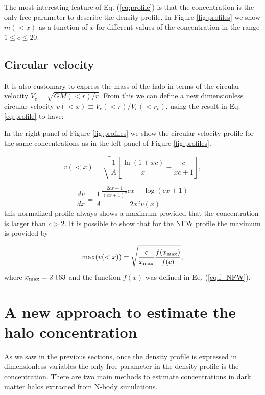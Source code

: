 \documentclass[useAMS,usenatbib]{mn2e}
\begin{document}
The most interesting feature of Eq. (\ref{eq:profile}) is that the
concentration is the only free parameter to describe the density
profile. In Figure \ref{fig:profiles} we show $m(<x)$ as
a function of $x$ for different values of the concentration in the range
$1\leq c \leq 20$.


\subsection{Circular velocity}

It is also customary to express the mass of the halo in terms of the
circular velocity $V_{c}=\sqrt{GM(<r)/r}$. From this we can
define a new dimensionless circular velocity $v(<x)\equiv
V_{c}(<r)/V_{c}(<r_v)$, using the result in Eq. \ref{eq:profile}
to have:


In the right panel of Figure \ref{fig:profiles} we show the circular
velocity profile for the same concentrations as in the left panel of
Figure \ref{fig:profiles}.

\begin{equation}
v(<x)=\sqrt{\frac{1}{A}\left[\frac{\ln\left(1+xc\right)}{x}-\frac{c}{xc+1}\right]},
\end{equation}

\begin{equation}
\frac{dv}{dx}=\frac{1}{A}\frac{\frac{2cx+1}{\left(cx+1\right)^{2}}cx-\log\left(cx+1\right)}{2x^{2}v\left(x\right)}
\end{equation}
%
this normalized profile always shows a maximum provided that the
concentration is larger than $c>2$.
It is possible to show that for the NFW profile the maximum is
provided by

\begin{equation}
\mathrm{max}(v(<x)) = \sqrt{\frac{c}{x_{\rm max}}\frac{f(x_{\rm
      max})}{f(c)}},
\label{eq:max_v}
\end{equation}
where $x_{\rm max}=2.163$ \citep{Klypin2014} and the function $f(x)$
was defined in Eq. (\ref{eq:f_NFW}).  
 
\section{A new approach to estimate the halo concentration}
\label{sec:method}

As we saw in the previous sections, once the density profile is
expressed in dimensionless variables the only free parameter in the
density profile  is the concentration. There are two main methods to
estimate concentrations in dark matter halos extracted from N-body
simulations.
\end{document}
